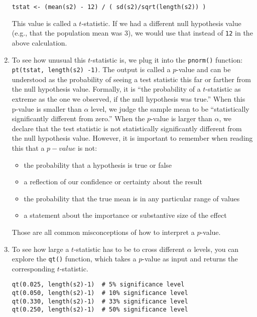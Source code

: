 \documentclass[a4paper,12pt]{article}
\begin{document}
\begin{enumerate}
\begin{verbatim}
tstat <- (mean(s2) - 12) / ( sd(s2)/sqrt(length(s2)) )
\end{verbatim}

\noindent This value is called a $t$-statistic. If we had a different null hypothesis value (e.g., that the population mean was 3), we would use that instead of \texttt{12} in the above calculation.

\item To see how unusual this $t$-statistic is, we plug it into the \texttt{pnorm()} function: \texttt{pt(tstat, length(s2) -1)}. The output is called a $p$-value and can be understood as the probability of seeing a test statistic this far or farther from the null hypothesis value. Formally, it is ``the probability of a $t$-statistic as extreme as the one we observed, if the null hypothesis was true.'' When this p-value is smaller than $\alpha$ level, we judge the sample mean to be ``statistically significantly different from zero.'' When the $p$-value is larger than $\alpha$, we declare that the test statistic is not statistically significantly different from the null hypothesis value. However, it is important to remember when reading this that a $p-value$ is not:

\begin{itemize}
\item the probability that a hypothesis is true or false
\item a reflection of our confidence or certainty about the result
\item the probability that the true mean is in any particular range of values
\item a statement about the importance or substantive size of the effect
\end{itemize}

\noindent Those are all common misconceptions of how to interpret a $p$-value.

\item To see how large a $t$-statistic has to be to cross different $\alpha$ levels, you can explore the \texttt{qt()} function, which takes a $p$-value as input and returns the corresponding $t$-statistic.

\begin{verbatim}
qt(0.025, length(s2)-1)  # 5% significance level
qt(0.050, length(s2)-1)  # 10% significance level
qt(0.330, length(s2)-1)  # 33% significance level
qt(0.250, length(s2)-1)  # 50% significance level
\end{verbatim}


\end{enumerate}
\end{document}
